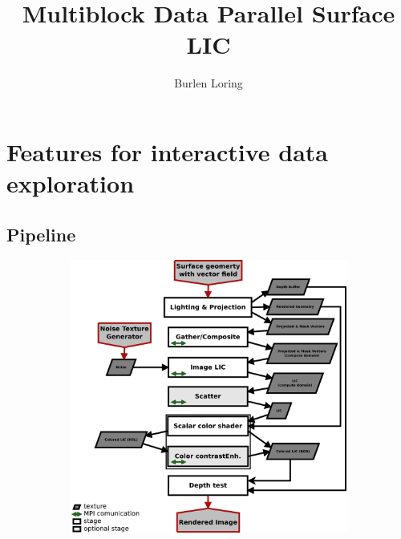 \documentclass[a4paper,10pt]{article}
\title{Multiblock Data Parallel Surface LIC}
\author{Burlen Loring}
\begin{document}
\maketitle

\begin{abstract}

\end{abstract}

\section{Features for interactive data exploration}
\subsection{Pipeline}

\begin{figure}[ht]
	\centering
	\begin{subfigure}{0.55\textwidth}
		\centering
		\includegraphics[width=\textwidth]{./images-data/dia-serial/surfacelic-painter-flow.png}
		\caption{}
		\label{fig:lic2d-flow}
	\end{subfigure}
	\begin{subfigure}{0.4\textwidth}
		\centering

\end{subfigure}
\end{figure}
\end{document}
